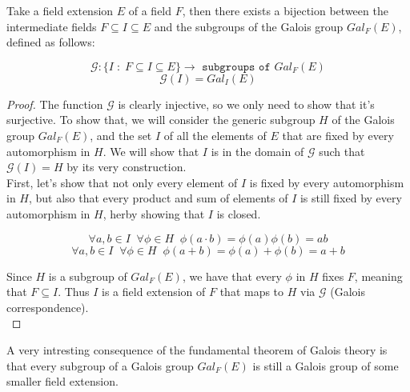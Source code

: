 \begin{theorem}
    Take a field extension $E$ of a field $F$, then there exists a bijection between 
    the intermediate fields $F \subseteq I \subseteq E$ and the subgroups of the
    Galois group $Gal_{F}(E)$, defined as follows:

    $$ \mathcal{G} : \{ I \;:\; F \subseteq I \subseteq E \} \rightarrow \texttt{ subgroups of } Gal_{F}(E) $$
    $$ \mathcal{G}(I) = Gal_{I}(E)  $$
\end{theorem}
\begin{proof}
    The function $\mathcal{G}$ is clearly injective, so we only need to show that it's surjective. To 
    show that, we will consider the generic subgroup $H$ of the Galois group 
    $Gal_{F}(E)$, and the set $I$ of all the elements of $E$ that are fixed by every
    automorphism in $H$. We will show that $I$ is in the domain of $\mathcal{G}$ such that
    $\mathcal{G}(I) = H$ by its very construction. \\

    First, let's show that not only every element of $I$ is fixed by every
    automorphism in $H$, but also that every product and sum of elements of $I$ is 
    still fixed by every automorphism in $H$, herby showing that $I$ is closed.

    $$ \forall a,b \in I \;\; \forall \phi \in H \;\; \phi(a \cdot b) = \phi(a)\phi(b) = ab $$
    $$ \forall a,b \in I \;\; \forall \phi \in H \;\; \phi(a + b) = \phi(a) + \phi(b) = a + b $$ \vspace{0.2em}

    Since $H$ is a subgroup of $Gal_{F}(E)$, we have that every $\phi$ in $H$ fixes $F$, meaning that
    $F \subseteq I$. Thus $I$ is a field extension of $F$ that maps to $H$ via $\mathcal{G}$ (Galois correspondence). \\
\end{proof}

A very intresting consequence of the fundamental theorem of Galois theory is that 
every subgroup of a Galois group $Gal_{F}(E)$ is still a Galois group of some smaller field
extension.

\newpage

